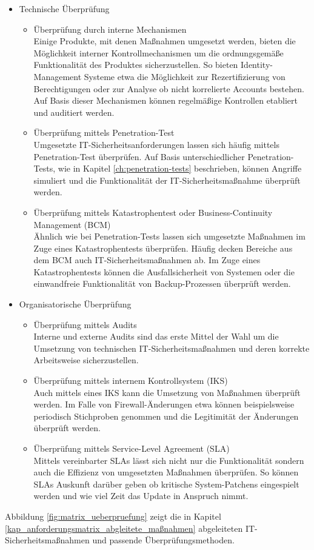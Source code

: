 \begin{itemize}
    \item Technische Überprüfung
    \begin{itemize}
        \item Überprüfung durch interne Mechanismen\\
        Einige Produkte, mit denen Maßnahmen umgesetzt werden, bieten die Möglichkeit interner Kontrollmechanismen um die ordnungsgemäße Funktionalität des Produktes sicherzustellen. So bieten Identity-Management Systeme etwa die Möglichkeit zur Rezertifizierung von Berechtigungen oder zur Analyse ob nicht korrelierte Accounts bestehen. Auf Basis dieser Mechanismen können regelmäßige Kontrollen etabliert und auditiert werden. 
        \item Überprüfung mittels Penetration-Test\\
        Umgesetzte IT-Sicherheitsanforderungen lassen sich häufig mittels Penetration-Test überprüfen. Auf Basis unterschiedlicher Penetration-Tests, wie in Kapitel \ref{ch:penetration-tests} beschrieben, können Angriffe simuliert und die Funktionalität der IT-Sicherheitsmaßnahme überprüft werden.
        \item Überprüfung mittels Katastrophentest oder \glqq{}Business-Continuity Management\grqq{} (BCM)\\
        Ähnlich wie bei Penetration-Tests lassen sich umgesetzte Maßnahmen im Zuge eines Katastrophentests überprüfen. Häufig decken Bereiche aus dem BCM auch IT-Sicherheitsmaßnahmen ab. Im Zuge eines Katastrophentests können die Ausfallsicherheit von Systemen oder die einwandfreie Funktionalität von Backup-Prozessen überprüft werden. 
    \end{itemize}
    \item Organisatorische Überprüfung
    \begin{itemize}
        \item Überprüfung mittels Audits\\
        Interne und externe Audits sind das erste Mittel der Wahl um die Umsetzung von technischen IT-Sicherheitsmaßnahmen und deren korrekte Arbeitsweise sicherzustellen. 
        \item Überprüfung mittels internem Kontrollsystem (IKS)\\
        Auch mittels eines IKS kann die Umsetzung von Maßnahmen überprüft werden. Im Falle von Firewall-Änderungen etwa können beispielsweise periodisch Stichproben genommen und die Legitimität der Änderungen überprüft werden. 
        \item Überprüfung mittels Service-Level Agreement (SLA)\\
        Mittels vereinbarter SLAs lässt sich nicht nur die Funktionalität sondern auch die Effizienz von umgesetzten Maßnahmen überprüfen. So können SLAs Auskunft darüber geben ob kritische System-Patchens eingespielt werden und wie viel Zeit das Update in Anspruch nimmt.
    \end{itemize}
\end{itemize}
\bigbreak
Abbildung \ref{fig:matrix_ueberpruefung} zeigt die in Kapitel \ref{kap_anforderungsmatrix_abgleitete_maßnahmen} abgeleiteten IT-Sicherheitsmaßnahmen und passende Überprüfungsmethoden. 

